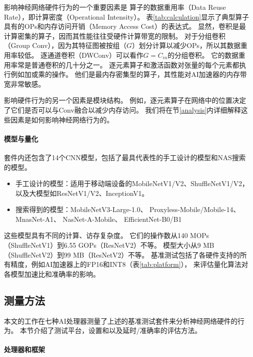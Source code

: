 
影响神经网络硬件行为的一个重要因素是
算子的数据重用率（Data Reuse Rate），即计算密度（Operational Intensity）。
表\ref{tab:calculation}显示了典型算子具有的OPs和内存访问开销（Memory Access Cost）的表达式。
显然，卷积是最计算密集的算子，因而其性能往往受硬件计算带宽的限制。
对于分组卷积（Group Conv），因为其特征图被按组（$G$）划分计算以减少OPs，所以其数据重用率较低。
逐通道卷积（DWConv）可以看作$G = C_{in}$的分组卷积。
它的数据重用率常是普通卷积的几十分之一。
逐元素算子和激活函数对张量的每个元素都执行例如加或乘的操作。
他们是最内存密集型的算子，其性能对AI加速器的内存带宽非常敏感。

影响硬件行为的另一个因素是模块结构。
例如，逐元素算子在网络中的位置决定了它们是否可以与Conv融合以减少内存访问。
我们将在节\ref{analysis}内详细解释这些因素是如何影响神经网络行为的。

\paragraph{模型与量化}
套件内还包含了14个CNN模型，包括了最具代表性的手工设计的模型和NAS搜索的模型。
\begin{itemize}
    \item 手工设计的模型：适用于移动端设备的MobileNetV1/V2、ShuffleNetV1/V2，
    以及大模型如ResNetV1/V2、InceptionV1\cite{szegedy2015going}。
    \item 搜索得到的模型：MobileNetV3-Large-1.0\cite{howard2019searching}、
    Proxyless-Mobile/Mobile-14\cite{cai2018proxylessnas}、
    MnasNet-A1\cite{tan2019mnasnet}、
    NasNet-A-Mobile\cite{zoph2018learning}、
    EfficientNet-B0/B1\cite{tan2019efficientnet}
\end{itemize}
这些模型具有不同的计算、访存复杂度。
它们的操作数从140 MOPs（ShuffleNetV1）到6.55 GOPs（ResNetV2）不等。
模型大小从9 MB（ShuffleNetV2）到99 MB（ResNetV2）不等。
基准测试包括了各硬件支持的所有精度，例如AI加速器上的FP16和INT8（表\ref{tab:platform}），
来评估量化算法对各模型加速比和准确率的影响。

\subsection{测量方法}
\label{measurement}
本文的工作在七种AI处理器测量了上述的基准测试套件来分析神经网络硬件的行为。
本节介绍了测试平台，设置和以及延时/准确率的评估方法。

\paragraph{处理器和框架}

